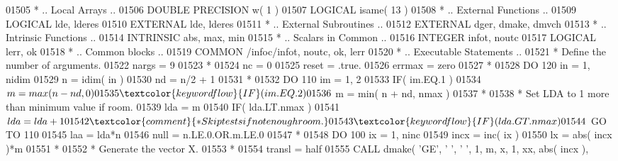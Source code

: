 \begin{DoxyCode}
01505 \textcolor{comment}{*     .. Local Arrays ..}
01506       \textcolor{keywordtype}{DOUBLE PRECISION}   w( 1 )
01507       \textcolor{keywordtype}{LOGICAL}            isame( 13 )
01508 \textcolor{comment}{*     .. External Functions ..}
01509       \textcolor{keywordtype}{LOGICAL}            lde, lderes
01510       \textcolor{keywordtype}{EXTERNAL}           lde, lderes
01511 \textcolor{comment}{*     .. External Subroutines ..}
01512       \textcolor{keywordtype}{EXTERNAL}           dger, dmake, dmvch
01513 \textcolor{comment}{*     .. Intrinsic Functions ..}
01514       \textcolor{keywordtype}{INTRINSIC}          abs, max, min
01515 \textcolor{comment}{*     .. Scalars in Common ..}
01516       \textcolor{keywordtype}{INTEGER}            infot, noutc
01517       \textcolor{keywordtype}{LOGICAL}            lerr, ok
01518 \textcolor{comment}{*     .. Common blocks ..}
01519       \textcolor{keyword}{COMMON}             /infoc/infot, noutc, ok, lerr
01520 \textcolor{comment}{*     .. Executable Statements ..}
01521 \textcolor{comment}{*     Define the number of arguments.}
01522       nargs = 9
01523 \textcolor{comment}{*}
01524       nc = 0
01525       reset = .true.
01526       errmax = zero
01527 \textcolor{comment}{*}
01528       \textcolor{keywordflow}{DO} 120 in = 1, nidim
01529          n = idim( in )
01530          nd = n/2 + 1
01531 \textcolor{comment}{*}
01532          \textcolor{keywordflow}{DO} 110 im = 1, 2
01533             \textcolor{keywordflow}{IF}( im.EQ.1 )
01534      $         m = max( n - nd, 0 )
01535             \textcolor{keywordflow}{IF}( im.EQ.2 )
01536      $         m = min( n + nd, nmax )
01537 \textcolor{comment}{*}
01538 \textcolor{comment}{*           Set LDA to 1 more than minimum value if room.}
01539             lda = m
01540             \textcolor{keywordflow}{IF}( lda.LT.nmax )
01541      $         lda = lda + 1
01542 \textcolor{comment}{*           Skip tests if not enough room.}
01543             \textcolor{keywordflow}{IF}( lda.GT.nmax )
01544      $         \textcolor{keywordflow}{GO TO} 110
01545             laa = lda*n
01546             null = n.LE.0.OR.m.LE.0
01547 \textcolor{comment}{*}
01548             \textcolor{keywordflow}{DO} 100 ix = 1, ninc
01549                incx = inc( ix )
01550                lx = abs( incx )*m
01551 \textcolor{comment}{*}
01552 \textcolor{comment}{*              Generate the vector X.}
01553 \textcolor{comment}{*}
01554                transl = half
01555                \textcolor{keyword}{CALL }dmake( \textcolor{stringliteral}{'GE'}, \textcolor{stringliteral}{' '}, \textcolor{stringliteral}{' '}, 1, m, x, 1, xx, abs( incx ),

\end{DoxyCode}
